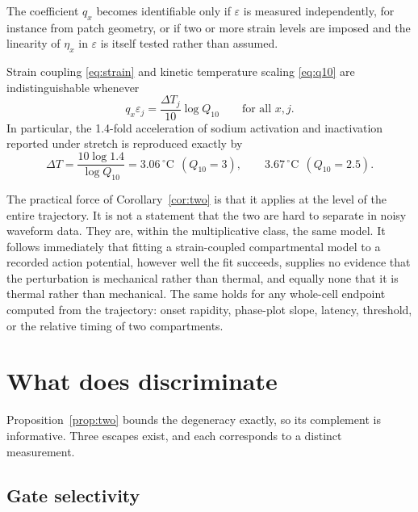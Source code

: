 \noindent The coefficient $q_x$ becomes identifiable only if $\varepsilon$ is
measured independently, for instance from patch geometry, or if two or more
strain levels are imposed and the linearity of $\eta_x$ in $\varepsilon$ is
itself tested rather than assumed.

\begin{corollary}
\label{cor:two}
Strain coupling \eqref{eq:strain} and kinetic temperature scaling
\eqref{eq:q10} are indistinguishable whenever
\begin{equation}
q_x\varepsilon_j=\frac{\Delta T_j}{10}\log Q_{10}
\qquad\text{for all }x,j.
\label{eq:match}
\end{equation}
In particular, the 1.4-fold acceleration of sodium activation and inactivation
reported under stretch \citep{morris2007} is reproduced exactly by
\begin{equation}
\Delta T=\frac{10\log 1.4}{\log Q_{10}}
=3.06\,^{\circ}\mathrm{C}\ \ (Q_{10}=3),
\qquad
3.67\,^{\circ}\mathrm{C}\ \ (Q_{10}=2.5).
\label{eq:dT}
\end{equation}
\end{corollary}

The practical force of Corollary~\ref{cor:two} is that it applies at the level of
the entire trajectory. It is not a statement that the two are hard to separate
in noisy waveform data. They are, within the multiplicative class, the same
model. It follows immediately that fitting a strain-coupled compartmental model
to a recorded action potential, however well the fit succeeds, supplies no
evidence that the perturbation is mechanical rather than thermal, and equally
none that it is thermal rather than mechanical. The same holds for any
whole-cell endpoint computed from the trajectory: onset rapidity, phase-plot
slope, latency, threshold, or the relative timing of two compartments.

\section{What does discriminate}
\label{sec:discrim}

Proposition~\ref{prop:two} bounds the degeneracy exactly, so its complement is
informative. Three escapes exist, and each corresponds to a distinct
measurement.

\subsection{Gate selectivity}

